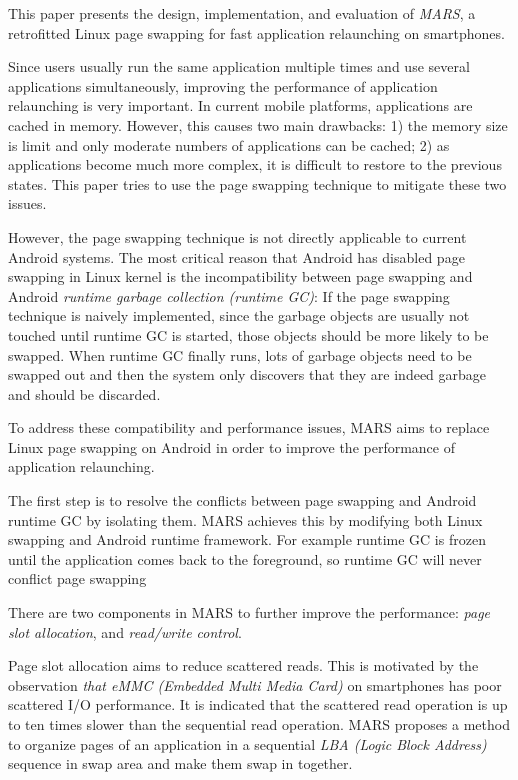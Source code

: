 \documentclass[paper=a4, fontsize=18pt]{article} %
\numberwithin{equation}{section} %
\numberwithin{figure}{section} %
\numberwithin{table}{section} %
\begin{document}
This paper presents the design, implementation, and evaluation of \emph{MARS}, a retrofitted Linux page swapping for fast application relaunching on smartphones.

Since users usually run the same application multiple times and use several applications simultaneously, improving the performance of application relaunching is very important. In current mobile platforms, applications are cached in memory. However, this causes two main drawbacks: 1) the memory size is limit and only moderate numbers of applications can be cached; 2) as applications become much more complex, it is difficult to restore to the previous states. This paper tries to use the page swapping technique to mitigate these two issues.

However, the page swapping technique is not directly applicable to current Android systems. The most critical reason that Android has disabled page swapping in Linux kernel is the incompatibility between page swapping and Android \emph{runtime garbage collection (runtime GC)}: If the page swapping technique is naively implemented, since the garbage objects are usually not touched until runtime GC is started, those objects should be more likely to be swapped. When runtime GC finally runs, lots of garbage objects need to be swapped out and then the system only discovers that they are indeed garbage and should be discarded.

To address these compatibility and performance issues, MARS aims to replace Linux page swapping on Android in order to improve the performance of application relaunching.

The first step is to resolve the conflicts between page swapping and Android runtime GC by isolating them. MARS achieves this by modifying both Linux swapping and Android runtime framework. For example runtime GC is frozen until the application comes back to the foreground, so runtime GC will never conflict page swapping

There are two components in MARS to further improve the performance: \emph{page slot allocation}, and \emph{read/write control}.

Page slot allocation aims to reduce scattered reads. This is motivated by the observation \emph{that eMMC (Embedded Multi Media Card)} on smartphones has poor scattered I/O performance. It is indicated that the scattered read operation is up to ten times slower than the sequential read operation. MARS proposes a method to organize pages of an application in a sequential \emph{LBA (Logic Block Address)} sequence in swap area and make them swap in together.
\end{document}
